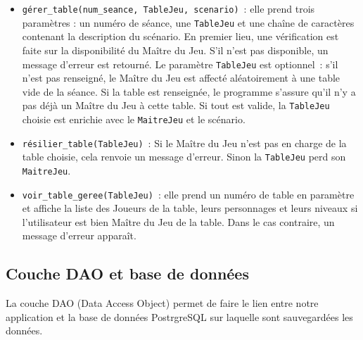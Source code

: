 \documentclass[11pt]{article}
\begin{document}
\begin{itemize}[label=, font=\small]
    \item \texttt{gérer\_table(num\_seance, TableJeu, scenario)}~: elle prend trois paramètres : un numéro de séance, une \texttt{TableJeu} et une chaîne de caractères contenant la description du scénario. En premier lieu, une vérification est faite sur la disponibilité du Maître du Jeu. S'il n'est pas disponible, un message d'erreur est retourné. Le paramètre \texttt{TableJeu} est optionnel~: s'il n'est pas renseigné, le Maître du Jeu est affecté aléatoirement à une table vide de la séance. Si la table est renseignée, le programme s'assure qu'il n'y a pas déjà un Maître du Jeu à cette table. Si tout est valide, la \texttt{TableJeu} choisie est enrichie avec le \texttt{MaitreJeu} et le scénario.
    
    \item \texttt{résilier\_table(TableJeu)}~: Si le Maître du Jeu n'est pas en charge de la table choisie, cela renvoie un message d'erreur. Sinon la \texttt{TableJeu} perd son \texttt{MaitreJeu}.
    
    \item \texttt{voir\_table\_geree(TableJeu)}~: elle prend un numéro de table en paramètre et affiche la liste des Joueurs de la table, leurs personnages et leurs niveaux si l'utilisateur est bien Maître du Jeu de la table. Dans le cas contraire, un message d'erreur apparaît.
\end{itemize}





\subsection{Couche DAO et base de données}

La couche DAO (Data Access Object) permet de faire le lien entre notre application et la base de données PostrgreSQL sur laquelle sont sauvegardées les données.






\end{document}

